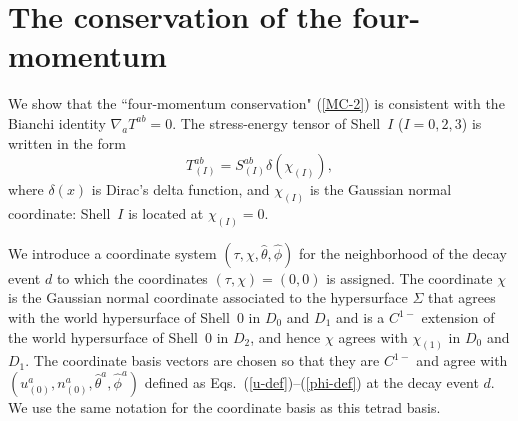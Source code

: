\documentclass[aps,preprint,preprintnumber,nofootinbib,amsmath,amssymb,ascmac,bm,12pt]{revtex4}
\newcommand{\thetah}{\hat{\theta}}
\newcommand{\phih}{\hat{\phi}}
\begin{document}
\section{The conservation of the four-momentum}

We show that the ``four-momentum conservation" (\ref{MC-2})  is consistent with the Bianchi identity 
$\nabla_aT^{ab}=0$. The stress-energy tensor of Shell~$I$ ($I=0,2,3$) is written in the form
$$
T_{(I)}^{ab}=S_{(I)}^{ab}\delta\left(\chi_{(I)}\right),
$$
where $\delta(x)$ is Dirac's delta function, and $\chi_{(I)} $ is the Gaussian normal 
coordinate: Shell~$I$ is located at $\chi_{(I)}=0$.

We introduce a coordinate system $(\tau,\chi, \hat{\theta},\hat{\phi})$ for the 
neighborhood of the decay event $d$ to which the coordinates $(\tau,\chi)=(0,0)$ is assigned.  
The coordinate $\chi$ is the Gaussian normal coordinate associated to the hypersurface  $\varSigma$ 
that agrees with the world hypersurface of Shell~0 in $D_0$ and $D_1$ and is 
a $C^{1-}$ extension of the world hypersurface of Shell~0 
in $D_2$, and hence $\chi$ agrees with $\chi_{(1)}$ in $D_0$ and $D_1$. 
The coordinate basis vectors are chosen so that 
they are $C^{1-}$ and agree with $\left(u_{(0)}^a, n_{(0)}^a, \thetah^a,\phih^a\right)$ defined 
as Eqs.~(\ref{u-def})--(\ref{phi-def}) at the decay event $d$. 
We use the same notation for the coordinate basis as this tetrad basis. 
 
\end{document}
